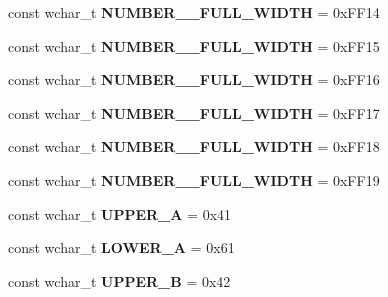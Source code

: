 \begin{DoxyCompactItemize}
\item 
\hypertarget{group___indexing_ga5308f3df9de908740d874f6428626b7f}{const wchar\-\_\-t {\bfseries N\-U\-M\-B\-E\-R\-\_\-\_\-\-F\-U\-L\-L\-\_\-\-W\-I\-D\-T\-H} = 0x\-F\-F14}\label{group___indexing_ga5308f3df9de908740d874f6428626b7f}

\item 
\hypertarget{group___indexing_ga30b24050c7edb74b9ac078f44425540d}{const wchar\-\_\-t {\bfseries N\-U\-M\-B\-E\-R\-\_\-\_\-\-F\-U\-L\-L\-\_\-\-W\-I\-D\-T\-H} = 0x\-F\-F15}\label{group___indexing_ga30b24050c7edb74b9ac078f44425540d}

\item 
\hypertarget{group___indexing_gaa4c7c78e2d2bbb069416ecdbf25bdbf2}{const wchar\-\_\-t {\bfseries N\-U\-M\-B\-E\-R\-\_\-\_\-\-F\-U\-L\-L\-\_\-\-W\-I\-D\-T\-H} = 0x\-F\-F16}\label{group___indexing_gaa4c7c78e2d2bbb069416ecdbf25bdbf2}

\item 
\hypertarget{group___indexing_ga702921929efbbf5e2cbd900adc30d263}{const wchar\-\_\-t {\bfseries N\-U\-M\-B\-E\-R\-\_\-\_\-\-F\-U\-L\-L\-\_\-\-W\-I\-D\-T\-H} = 0x\-F\-F17}\label{group___indexing_ga702921929efbbf5e2cbd900adc30d263}

\item 
\hypertarget{group___indexing_gaade1f8310ff8681d6407c62c96f7c96d}{const wchar\-\_\-t {\bfseries N\-U\-M\-B\-E\-R\-\_\-\_\-\-F\-U\-L\-L\-\_\-\-W\-I\-D\-T\-H} = 0x\-F\-F18}\label{group___indexing_gaade1f8310ff8681d6407c62c96f7c96d}

\item 
\hypertarget{group___indexing_ga3b302523ae934ed3a281ca00c19e1372}{const wchar\-\_\-t {\bfseries N\-U\-M\-B\-E\-R\-\_\-\_\-\-F\-U\-L\-L\-\_\-\-W\-I\-D\-T\-H} = 0x\-F\-F19}\label{group___indexing_ga3b302523ae934ed3a281ca00c19e1372}

\item 
\hypertarget{group___indexing_ga7a78db0c937e07a0bf713cd99f5fad6a}{const wchar\-\_\-t {\bfseries U\-P\-P\-E\-R\-\_\-\-A} = 0x41}\label{group___indexing_ga7a78db0c937e07a0bf713cd99f5fad6a}

\item 
\hypertarget{group___indexing_ga866a9303557020899b505e70c1ff96f9}{const wchar\-\_\-t {\bfseries L\-O\-W\-E\-R\-\_\-\-A} = 0x61}\label{group___indexing_ga866a9303557020899b505e70c1ff96f9}

\item 
\hypertarget{group___indexing_ga450910041c34b865d194e961d9b68595}{const wchar\-\_\-t {\bfseries U\-P\-P\-E\-R\-\_\-\-B} = 0x42}\label{group___indexing_ga450910041c34b865d194e961d9b68595}


\end{DoxyCompactItemize}
